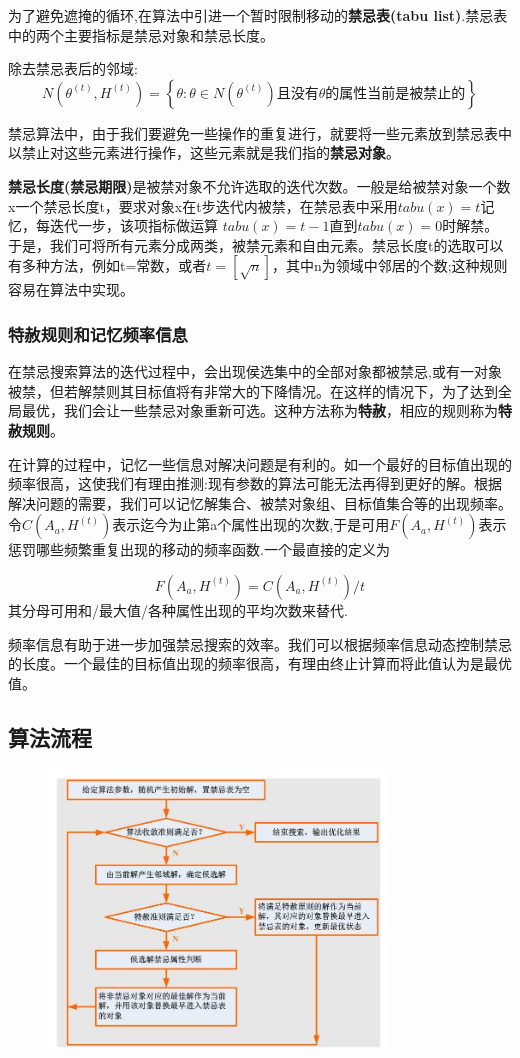 \documentclass[11pt,a4paper,oneside]{book}
\begin{document}
为了避免遮掩的循环,在算法中引进一个暂时限制移动的\textbf{禁忌表(tabu list)}.禁忌表中的两个主要指标是禁忌对象和禁忌长度。

除去禁忌表后的邻域:
$$ N(\theta^{(t)},H^{(t)})= \left\lbrace \theta: \theta \in N(\theta^{(t)})且没有\theta 的属性当前是被禁止的\right\rbrace $$

禁忌算法中，由于我们要避免一些操作的重复进行，就要将一些元素放到禁忌表中以禁止对这些元素进行操作，这些元素就是我们指的\textbf{禁忌对象}。

\textbf{禁忌长度(禁忌期限)}是被禁对象不允许选取的迭代次数。一般是给被禁对象一个数x一个禁忌长度t，要求对象x在t步迭代内被禁，在禁忌表中采用$ tabu(x)=t $记忆，每迭代一步，该项指标做运算
$ tabu(x)=t-1 $直到$ tabu(x)=0 $时解禁。于是，我们可将所有元素分成两类，被禁元素和自由元素。禁忌长度t的选取可以有多种方法，例如t=常数，或者$ t=[\sqrt{n}] $，其中n为领域中邻居的个数;这种规则容易在算法中实现。

\subsubsection{特赦规则和记忆频率信息}
在禁忌搜索算法的迭代过程中，会出现侯选集中的全部对象都被禁忌,或有一对象被禁，但若解禁则其目标值将有非常大的下降情况。在这样的情况下，为了达到全局最优，我们会让一些禁忌对象重新可选。这种方法称为\textbf{特赦}，相应的规则称为\textbf{特赦规则}。

在计算的过程中，记忆一些信息对解决问题是有利的。如一个最好的目标值出现的频率很高，这使我们有理由推测:现有参数的算法可能无法再得到更好的解。根据解决问题的需要，我们可以记忆解集合、被禁对象组、目标值集合等的出现频率。令$ C(A_a,H^{(t)}) $表示迄今为止第a个属性出现的次数,于是可用$ F(A_a,H^{(t)}) $表示惩罚哪些频繁重复出现的移动的频率函数.一个最直接的定义为

$$ F(A_a,H^{(t)}) = C(A_a,H^{(t)})/t $$
其分母可用和/最大值/各种属性出现的平均次数来替代.

频率信息有助于进一步加强禁忌搜索的效率。我们可以根据频率信息动态控制禁忌的长度。一个最佳的目标值出现的频率很高，有理由终止计算而将此值认为是最优值。

\subsection{算法流程}
\begin{figure}[H]
	\centering
	\includegraphics[width=0.8\textwidth]{12.png}
\end{figure}
\end{document}
